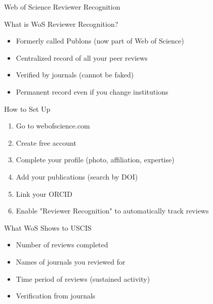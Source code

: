 \documentclass[11pt]{beamer}
\begin{document}
				\begin{frame}{Web of Science Reviewer Recognition}
					\scriptsize
					\begin{block}{What is WoS Reviewer Recognition?}
						\begin{itemize}
							\item Formerly called Publons (now part of Web of Science)
							\item Centralized record of all your peer reviews
							\item Verified by journals (cannot be faked)
							\item Permanent record even if you change institutions
						\end{itemize}
					\end{block}
					\begin{block}{How to Set Up}
						\begin{enumerate}
							\item Go to webofscience.com
							\item Create free account
							\item Complete your profile (photo, affiliation, expertise)
							\item Add your publications (search by DOI)
							\item Link your ORCID
							\item Enable "Reviewer Recognition" to automatically track reviews
						\end{enumerate}
					\end{block}
					\begin{block}{What WoS Shows to USCIS}
						\begin{itemize}
							\item Number of reviews completed
							\item Names of journals you reviewed for
							\item Time period of reviews (sustained activity)
							\item Verification from journals
						\end{itemize}
					\end{block}
				\end{frame}
				
\end{document}
